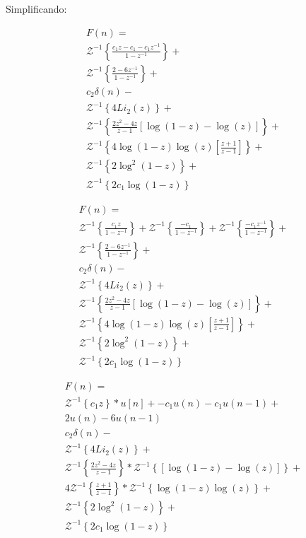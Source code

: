 \documentclass[a4paper,10pt]{article}
\begin{document}
Simplificando:

$$
\begin{array}{lcl} 
 F(n) = \\
 \mathcal{Z}^{-1}\left\{\displaystyle \frac{c_1z - c_1 - c_1z^{-1}}{1-z^{-1}}\right\} + \\
 \mathcal{Z}^{-1}\left\{\displaystyle \frac{2  - 6z ^{-1}}{1-z^{-1}}\right\}+\\
 c_2 \delta(n)-\\
 \mathcal{Z}^{-1}\left\{4 Li_2(z)\right\}+\\
 \mathcal{Z}^{-1}\left\{\displaystyle \frac{2 z^2 - 4z}{z-1}\displaystyle \left[\log(1-z) - \log(z)\right]\right\} +\\
 \mathcal{Z}^{-1}\left\{4 \log(1-z)\log(z) \left[\displaystyle \frac{ z  + 1}{z-1}\right]\right\}+\\
 \mathcal{Z}^{-1}\left\{2 \log^2(1-z)\right\} + \\
 \mathcal{Z}^{-1}\left\{2 c_1  \log(1-z)\right\} 
\end{array} 
$$



$$
\begin{array}{lcl} 
 F(n) = \\
 \mathcal{Z}^{-1}\left\{\displaystyle \frac{c_1z }{1-z^{-1}}\right\} +
 \mathcal{Z}^{-1}\left\{\displaystyle \frac{- c_1}{1-z^{-1}}\right\} + 
 \mathcal{Z}^{-1}\left\{\displaystyle \frac{- c_1z^{-1}}{1-z^{-1}}\right\} + \\
 \mathcal{Z}^{-1}\left\{\displaystyle \frac{2  - 6z ^{-1}}{1-z^{-1}}\right\}+\\
 c_2 \delta(n)-\\
 \mathcal{Z}^{-1}\left\{4 Li_2(z)\right\}+\\
 \mathcal{Z}^{-1}\left\{\displaystyle \frac{2 z^2 - 4z}{z-1}\displaystyle \left[\log(1-z) - \log(z)\right]\right\} +\\
 \mathcal{Z}^{-1}\left\{4 \log(1-z)\log(z) \left[\displaystyle \frac{ z  + 1}{z-1}\right]\right\}+\\
 \mathcal{Z}^{-1}\left\{2 \log^2(1-z)\right\} + \\
 \mathcal{Z}^{-1}\left\{2 c_1  \log(1-z)\right\} 
\end{array} 
$$


$$
\begin{array}{lcl} 
 F(n) = \\
 \mathcal{Z}^{-1}\left\{c_1z\right\} *u[n] +
 -c_1 u(n) - c_1 u(n-1) + \\
 2 u(n) -6 u(n-1) \\
 c_2 \delta(n)-\\
 \mathcal{Z}^{-1}\left\{4 Li_2(z)\right\}+\\
 \mathcal{Z}^{-1}\left\{\displaystyle \frac{2 z^2 - 4z}{z-1}\right\} *
 \mathcal{Z}^{-1}\left\{\displaystyle \left[\log(1-z) - \log(z)\right]\right\} +\\
 4\mathcal{Z}^{-1}\left\{\displaystyle \frac{ z  + 1}{z-1}\right\}*
 \mathcal{Z}^{-1}\left\{ \log(1-z)\log(z) \right\}+\\
 \mathcal{Z}^{-1}\left\{2 \log^2(1-z)\right\} + \\
 \mathcal{Z}^{-1}\left\{2 c_1  \log(1-z)\right\} 
\end{array} 
$$
\end{document}
